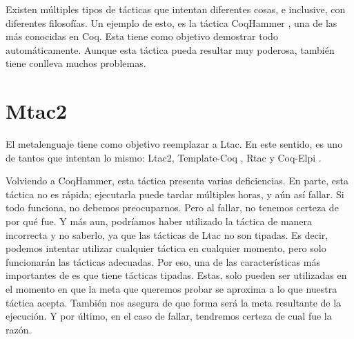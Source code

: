 Existen múltiples tipos de tácticas que intentan diferentes cosas, e inclusive, con diferentes filosofías.
Un ejemplo de esto, es la táctica CoqHammer \cite{DBLP:journals/jar/CzajkaK18}, una de las más conocidas en Coq. Esta tiene como objetivo demostrar todo automáticamente.
Aunque esta táctica pueda resultar muy poderosa, también tiene conlleva muchos problemas.

\section{Mtac2}

El metalenguaje \Mtac \cite{DBLP:journals/pacmpl/KaiserZKRD18} tiene como objetivo reemplazar a Ltac.
En este sentido, es uno de tantos que intentan lo mismo: Ltac2, Template-Coq \cite{DBLP:conf/itp/AnandBCST18}, Rtac \cite{DBLP:conf/esop/MalechaB16} y Coq-Elpi \cite{tassi:hal-01637063}.

Volviendo a CoqHammer, esta táctica presenta varias deficiencias.
En parte, esta táctica no es rápida; ejecutarla puede tardar múltiples horas, y aún así fallar.
Si todo funciona, no debemos preocuparnos.
Pero al fallar, no tenemos certeza de por qué fue.
Y más aun, podríamos haber utilizado la táctica de manera incorrecta y no saberlo, ya que las tácticas de Ltac no son tipadas.
Es decir, podemos intentar utilizar cualquier táctica en cualquier momento, pero solo funcionarán las tácticas adecuadas.
Por eso, una de las características más importantes de \mtac es que tiene tácticas tipadas.
Estas, solo pueden ser utilizadas en el momento en que la meta que queremos probar se aproxima a lo que nuestra táctica acepta.
También nos asegura de que forma será la meta resultante de la ejecución.
Y por último, en el caso de fallar, tendremos certeza de cual fue la razón.

